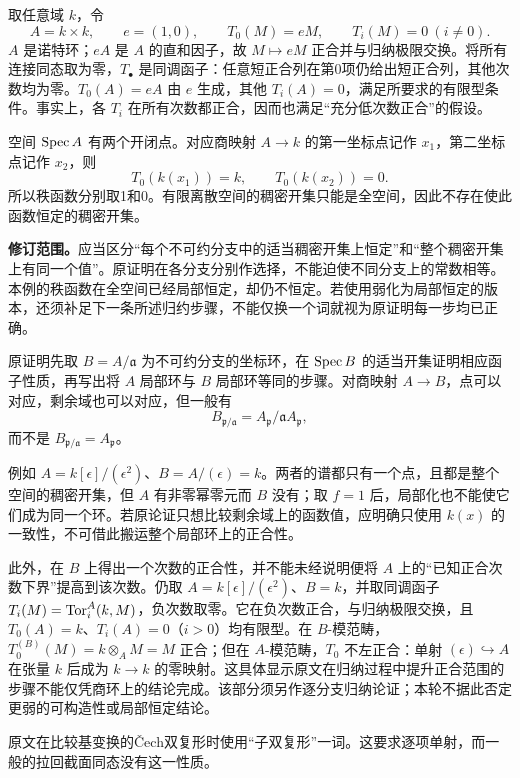 取任意域 $k$，令
\[
 A=k\times k,\qquad e=(1,0),\qquad
 T_0(M)=eM,\qquad T_i(M)=0\ (i\ne0).
\]
$A$ 是诺特环；$eA$ 是 $A$ 的直和因子，故 $M\mapsto eM$ 正合并与归纳极限交换。将所有连接同态取为零，$T_\bullet$ 是同调函子：任意短正合列在第0项仍给出短正合列，其他次数均为零。$T_0(A)=eA$ 由 $e$ 生成，其他 $T_i(A)=0$，满足所要求的有限型条件。事实上，各 $T_i$ 在所有次数都正合，因而也满足“充分低次数正合”的假设。

空间 $\operatorname{Spec} A$ 有两个开闭点。对应商映射 $A\to k$ 的第一坐标点记作 $x_1$，第二坐标点记作 $x_2$，则
\[
 T_0(k(x_1))=k,
 \qquad T_0(k(x_2))=0.
\]
所以秩函数分别取1和0。有限离散空间的稠密开集只能是全空间，因此不存在使此函数恒定的稠密开集。

\textbf{修订范围。}应当区分“每个不可约分支中的适当稠密开集上恒定”和“整个稠密开集上有同一个值”。原证明在各分支分别作选择，不能迫使不同分支上的常数相等。本例的秩函数在全空间已经局部恒定，却仍不恒定。若使用弱化为局部恒定的版本，还须补足下一条所述归约步骤，不能仅换一个词就视为原证明每一步均已正确。

原证明先取 $B=A/\mathfrak a$ 为不可约分支的坐标环，在 $\operatorname{Spec} B$ 的适当开集证明相应函子性质，再写出将 $A$ 局部环与 $B$ 局部环等同的步骤。对商映射 $A\to B$，点可以对应，剩余域也可以对应，但一般有
\[
 B_{\mathfrak p/\mathfrak a}
 =A_{\mathfrak p}/\mathfrak a A_{\mathfrak p},
\]
而不是 $B_{\mathfrak p/\mathfrak a}=A_{\mathfrak p}$。

例如 $A=k[\epsilon]/(\epsilon^2)$、$B=A/(\epsilon)=k$。两者的谱都只有一个点，且都是整个空间的稠密开集，但 $A$ 有非零幂零元而 $B$ 没有；取 $f=1$ 后，局部化也不能使它们成为同一个环。若原论证只想比较剩余域上的函数值，应明确只使用 $k(x)$ 的一致性，不可借此搬运整个局部环上的正合性。

此外，在 $B$ 上得出一个次数的正合性，并不能未经说明便将 $A$ 上的“已知正合次数下界”提高到该次数。仍取 $A=k[\epsilon]/(\epsilon^2)$、$B=k$，并取同调函子 $T_i(M)=\operatorname{Tor}_i^A(k,M)$，负次数取零。它在负次数正合，与归纳极限交换，且 $T_0(A)=k$、$T_i(A)=0$（$i>0$）均有限型。在 $B$-模范畴，$T_0^{(B)}(M)=k\otimes_A M=M$ 正合；但在 $A$-模范畴，$T_0$ 不左正合：单射 $(\epsilon)\hookrightarrow A$ 在张量 $k$ 后成为 $k\to k$ 的零映射。这具体显示原文在归纳过程中提升正合范围的步骤不能仅凭商环上的结论完成。该部分须另作逐分支归纳论证；本轮不据此否定更弱的可构造性或局部恒定结论。

原文在比较基变换的Čech双复形时使用“子双复形”一词。这要求逐项单射，而一般的拉回截面同态没有这一性质。

